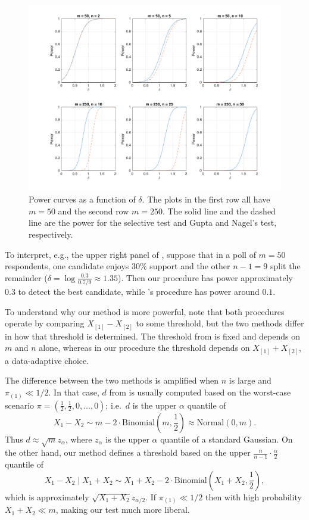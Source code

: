 \documentclass[11pt]{article}
\theoremstyle{definition}
\theoremstyle{custom}
\begin{document}
\begin{figure}[htbp]
\begin{center}
\includegraphics[width = \textwidth, clip, trim = {4cm 2cm 4cm 2cm}]{plotMultinomialPower}
\end{center}
\caption{Power curves as a function of $\delta$. The plots in the first row all have $m = 50$ and the second row $m = 250$. The solid line and the dashed line are the power for the selective test and Gupta and Nagel's test, respectively.}
\label{fig:power}
\end{figure}

To interpret, e.g., the upper right panel of , suppose that in a poll of $m = 50$ respondents, one candidate enjoys $30\%$ support and the other $n - 1 = 9$ split the remainder ($\delta = \log\frac{0.3}{0.7 / 9} \approx 1.35$). Then our procedure has power approximately $0.3$ to detect the best candidate, while \citeauthor{Gupta:1967wg}'s procedure has power around $0.1$.

To understand why our method is more powerful, note that both procedures operate by comparing $X_{[1]}-X_{[2]}$ to some threshold, but the two methods differ in how that threshold is determined. The threshold from \citet{Gupta:1967wg} is fixed and depends on $m$ and $n$ alone, whereas in our procedure the threshold depends on $X_{[1]}+X_{[2]}$, a data-adaptive choice. 

The difference between the two methods is amplified when $n$ is large and $\pi_{(1)} \ll 1/2$. In that case, $d$ from \citeauthor{Gupta:1967wg} is usually computed based on the worst-case scenario $\pi = \left(\frac{1}{2}, \frac{1}{2}, 0, \ldots, 0\right)$; i.e.\ $d$ is the upper $\alpha$ quantile of
$$X_1 - X_2 \sim m - 2 \cdot \text{Binomial}\left(m, \frac{1}{2}\right) \approx \text{Normal}\left(0, m\right).$$
Thus $d \approx \sqrt{m} z_\alpha$, where $z_\alpha$ is the upper $\alpha$ quantile of a standard Gaussian. On the other hand, our method defines a threshold based on the upper $\frac{n}{n-1} \cdot \frac{\alpha}{2}$ quantile of
$$X_1 - X_2 \mid X_1 + X_2 \sim X_1 + X_2 - 2 \cdot \text{Binomial}\left(X_1 + X_2, \frac{1}{2}\right),$$
which is approximately $\sqrt{X_1 + X_2} z_{\alpha / 2}$. If $\pi_{(1)} \ll 1/2$ then with high probability $X_1 + X_2 \ll  m$, making our test much more liberal.
\end{document}

